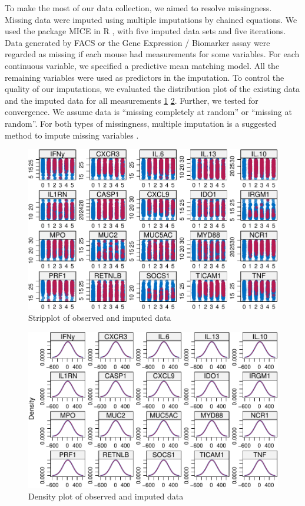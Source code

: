 \documentclass[webpdf,large,contemporary,namedate]{oup-authoring-template}
\theoremstyle{thmstyleone}
\theoremstyle{thmstyletwo}
\theoremstyle{thmstylethree}
\begin{document}
To make the most of our data collection, we aimed to resolve
missingness. Missing data were imputed using multiple imputations by
chained equations. We used the package MICE in R \citet{van2011mice},
with five imputed data sets and five iterations. Data generated by FACS
or the Gene Expression / Biomarker assay were regarded as missing if
each mouse had measurements for some variables. For each continuous
variable, we specified a predictive mean matching model. All the
remaining variables were used as predictors in the imputation. To
control the quality of our imputations, we evaluated the distribution
plot of the existing data and the imputed data for all measurements
\ref{fig:fig1} \ref{fig:fig2}. Further, we tested for convergence. We
assume data is ``missing completely at random'' or ``missing at
random''. For both types of missingness, multiple imputation is a
suggested method to impute missing variables \citet{van2018flexible}.

\begin{figure}[th]
\includegraphics[width=1\linewidth]{Article_hybrids_tolerance_files/figure-latex/fig1-1} \caption{Stripplot of observed and imputed data}\label{fig:fig1}
\end{figure}

\begin{figure}[th]
\includegraphics[width=1\linewidth]{Article_hybrids_tolerance_files/figure-latex/fig2-1} \caption{Density plot of observed and imputed data}\label{fig:fig2}
\end{figure}
\end{document}
